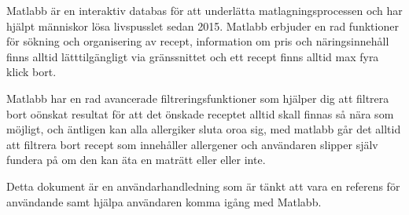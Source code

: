 Matlabb är en interaktiv databas för att underlätta
matlagningsprocessen och har hjälpt människor lösa livspusslet sedan
2015. Matlabb erbjuder en rad funktioner för sökning och organisering
av recept, information om pris och näringsinnehåll finns alltid
lätttilgängligt via gränssnittet och ett recept finns alltid max fyra
klick bort.

Matlabb har en rad avancerade filtreringsfunktioner som hjälper dig
att filtrera bort oönskat resultat för att det önskade receptet alltid
skall finnas så nära som möjligt, och äntligen kan alla allergiker
sluta oroa sig, med matlabb går det alltid att filtrera bort recept
som innehåller allergener och användaren slipper själv fundera på om
den kan äta en maträtt eller eller inte.

Detta dokument är en användarhandledning som är tänkt att vara en
referens för användande samt hjälpa användaren komma igång med Matlabb.

